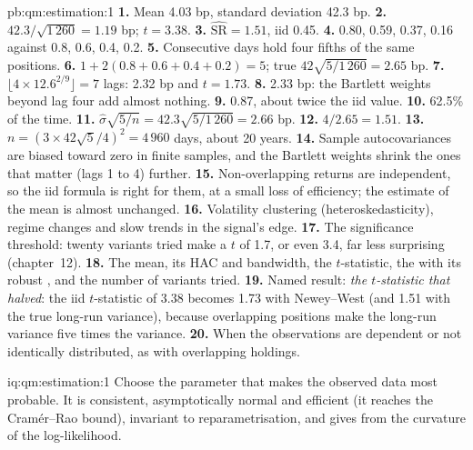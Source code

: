 \begin{solution}{pb:qm:estimation:1}
\textbf{1.} Mean 4.03 bp, standard deviation 42.3 bp.
\textbf{2.} $42.3/\sqrt{1\,260} = 1.19$ bp; $t = 3.38$.
\textbf{3.} $\widehat{\mathrm{SR}} = 1.51$, iid  0.45.
\textbf{4.} 0.80, 0.59, 0.37, 0.16 against 0.8, 0.6, 0.4, 0.2.
\textbf{5.} Consecutive days hold four fifths of the same positions.
\textbf{6.} $1 + 2(0.8 + 0.6 + 0.4 + 0.2) = 5$; true  $42\sqrt{5/1\,260} = 2.65$ bp.
\textbf{7.} $\lfloor4 \times 12.6^{2/9}\rfloor = 7$ lags: 2.32 bp and $t = 1.73$.
\textbf{8.} 2.33 bp: the Bartlett weights beyond lag four add almost nothing.
\textbf{9.} 0.87, about twice the iid value.
\textbf{10.} 62.5\% of the time.
\textbf{11.} $\hat\sigma\sqrt{5/n} = 42.3\sqrt{5/1\,260} = 2.66$ bp.
\textbf{12.} $4/2.65 = 1.51$.
\textbf{13.} $n = (3 \times 42\sqrt5/4)^2 = 4\,960$ days, about 20 years.
\textbf{14.} Sample autocovariances are biased toward zero in finite samples, and the Bartlett weights shrink the ones that
matter (lags 1 to 4) further.
\textbf{15.} Non-overlapping returns are independent, so the iid formula is right for them, at a small loss of efficiency; the
estimate of the mean is almost unchanged.
\textbf{16.} Volatility clustering (heteroskedasticity), regime changes and slow trends in the signal's edge.
\textbf{17.} The significance threshold: twenty variants tried make a $t$ of 1.7, or even 3.4, far less surprising (chapter~12).
\textbf{18.} The mean, its HAC  and bandwidth, the $t$-statistic, the  with its robust ,
and the number of variants tried.
\textbf{19.} Named result: \emph{the $t$-statistic that halved}: the iid $t$-statistic of 3.38 becomes 1.73 with Newey--West
 (and 1.51 with the true long-run variance), because overlapping positions make the long-run variance five
times the variance.
\textbf{20.} When the observations are dependent or not identically distributed, as with overlapping holdings.
\end{solution}

\begin{solution}{iq:qm:estimation:1}
Choose the parameter that makes the observed data most probable. It is consistent, asymptotically normal and efficient (it
reaches the Cramér--Rao bound), invariant to reparametrisation, and gives  from the curvature of the
log-likelihood.
\end{solution}

